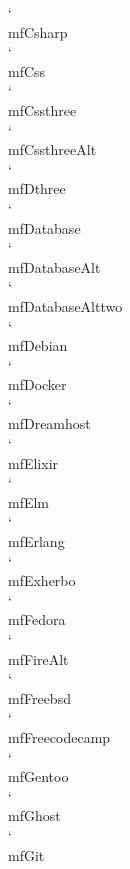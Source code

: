 \documentclass[parskip=half, twocolumn, 13pt]{scrartcl}
\begin{document}
\mfCsharp \quad \char`\\mfCsharp \\
\mfCss \quad \char`\\mfCss \\
\mfCssthree \quad \char`\\mfCssthree \\
\mfCssthreeAlt \quad \char`\\mfCssthreeAlt \\
\mfDthree \quad \char`\\mfDthree \\
\mfDatabase \quad \char`\\mfDatabase \\
\mfDatabaseAlt \quad \char`\\mfDatabaseAlt \\
\mfDatabaseAlttwo \quad \char`\\mfDatabaseAlttwo \\
\mfDebian \quad \char`\\mfDebian \\
\mfDocker \quad \char`\\mfDocker \\
\mfDreamhost \quad \char`\\mfDreamhost \\
\mfElixir \quad \char`\\mfElixir \\
\mfElm \quad \char`\\mfElm \\
\mfErlang \quad \char`\\mfErlang \\
\mfExherbo \quad \char`\\mfExherbo \\
\mfFedora \quad \char`\\mfFedora \\
\mfFireAlt \quad \char`\\mfFireAlt \\
\mfFreebsd \quad \char`\\mfFreebsd \\
\mfFreecodecamp \quad \char`\\mfFreecodecamp \\
\mfGentoo \quad \char`\\mfGentoo \\
\mfGhost \quad \char`\\mfGhost \\
\mfGit \quad \char`\\mfGit \\
\end{document}

